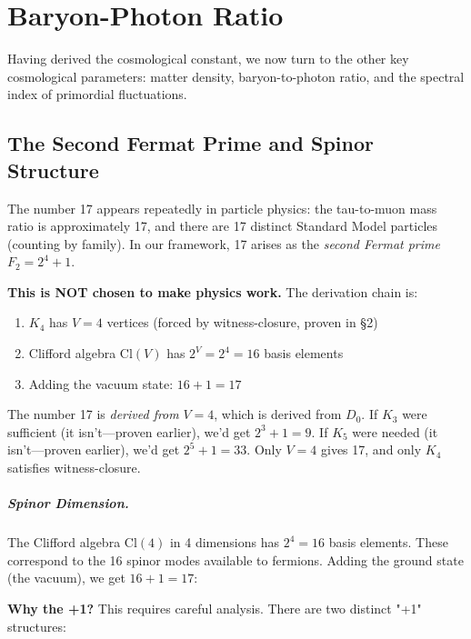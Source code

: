 \documentclass[11pt,a4paper]{book}
\begin{document}
\chapter{Baryon-Photon Ratio}
\label{chap:matter-density}

Having derived the cosmological constant, we now turn to the other key cosmological parameters: matter density, baryon-to-photon ratio, and the spectral index of primordial fluctuations.

\section{The Second Fermat Prime and Spinor Structure}

The number 17 appears repeatedly in particle physics: the tau-to-muon mass ratio is 
approximately 17, and there are 17 distinct Standard Model particles (counting by family). 
In our framework, 17 arises as the \emph{second Fermat prime} $F_2 = 2^4 + 1$.

\textbf{This is NOT chosen to make physics work.} The derivation chain is:
\begin{enumerate}
\item $K_4$ has $V = 4$ vertices (forced by witness-closure, proven in \S 2)
\item Clifford algebra $\text{Cl}(V)$ has $2^V = 2^4 = 16$ basis elements
\item Adding the vacuum state: $16 + 1 = 17$
\end{enumerate}

The number 17 is \emph{derived from} $V = 4$, which is derived from $D_0$. 
If $K_3$ were sufficient (it isn't---proven earlier), we'd get $2^3 + 1 = 9$.
If $K_5$ were needed (it isn't---proven earlier), we'd get $2^5 + 1 = 33$.
Only $V = 4$ gives 17, and only $K_4$ satisfies witness-closure.

\paragraph{Spinor Dimension.}
The Clifford algebra $\text{Cl}(4)$ in 4 dimensions has $2^4 = 16$ basis elements. These 
correspond to the 16 spinor modes available to fermions. Adding the ground state (the 
vacuum), we get $16 + 1 = 17$:

\textbf{Why the +1?} This requires careful analysis. There are two distinct "+1" structures:
\end{document}
